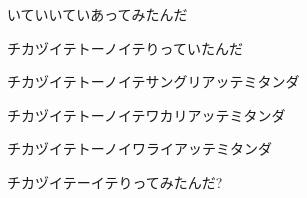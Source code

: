 \documentclass[a4paper,tate,twocolumn,12pt]{ltjtarticle}
\begin{document}
\begin{flushleft}
\begin{minipage}{\linewidth}
いていいていあってみたんだ

チカヅイテトーノイテりっていたんだ

チカヅイテトーノイテサングリアッテミタンダ

チカヅイテトーノイテワカリアッテミタンダ

チカヅイテトーノイワライアッテミタンダ

チカヅイテーイテりってみたんだ?
\end{minipage}

\end{flushleft}
\end{document}
